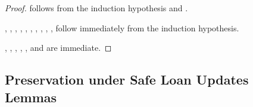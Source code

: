 \begin{proof}
   follows from the induction hypothesis and
  .

  , , ,
  , , , ,
  , , ,  follow
  immediately from the induction hypothesis.

  , , , ,
  , and  are immediate.

\end{proof}

\subsection{Preservation under Safe Loan Updates Lemmas}
\label{sec:safe-loan-lemmas}

